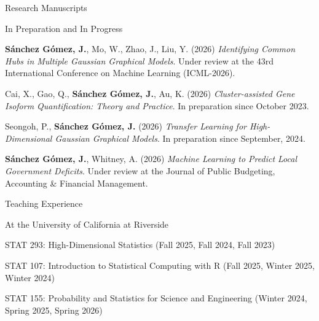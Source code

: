 \documentclass{resume_customized} %
\begin{document}
\begin{rSection}{Research Manuscripts}
\begin{rSubsection}{In Preparation and In Progress}{}{}
    	\item {\bf Sánchez Gómez, J.}, Mo, W., Zhao, J., Liu, Y. (2026) {\it Identifying Common Hubs in Multiple Gaussian Graphical Models}. Under review at the 43rd International Conference on Machine Learning (ICML-2026).

		\item Cai, X., Gao, Q., {\bf Sánchez Gómez, J.}, Au, K. (2026)  {\it Cluster-assisted Gene Isoform Quantification: Theory and Practice}. In preparation since October 2023.


    	\item Seongoh, P., {\bf Sánchez Gómez, J.} (2026) {\it Transfer Learning for High-Dimensional Gaussian Graphical Models}. In preparation since September, 2024.
    	
    	\item {\bf Sánchez Gómez, J.}, Whitney, A. (2026) {\it Machine Learning to Predict Local Government Deficits}. Under review at the Journal of Public Budgeting, Accounting \& Financial Management. 
    	
    	
	\end{rSubsection}
    
\end{rSection}

\begin{rSection}{Teaching Experience}
		
	\begin{rSubsection}{At the University of California at Riverside}{}{}{}
		
		\item STAT 293: High-Dimensional Statistics (Fall 2025, Fall 2024, Fall 2023)
		\item STAT 107: Introduction to Statistical Computing with R (Fall 2025, Winter 2025, Winter 2024)
		\item STAT 155: Probability and Statistics for Science and
		Engineering (Winter 2024, Spring 2025, Spring 2026)
		
	\end{rSubsection}
	
	
\end{rSection}
\end{document}
